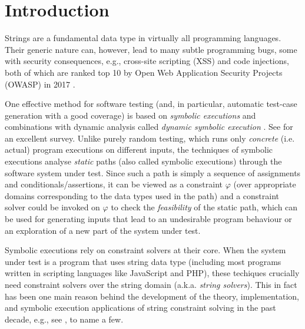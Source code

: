 \section{Introduction}
\label{sec:intro}

Strings are a fundamental data type in virtually all programming languages.
Their generic nature can, however, lead to many subtle programming 
bugs, some with security consequences, e.g., cross-site scripting
(XSS) and code injections, both of which are ranked top 10 by Open Web
Application Security Projects (OWASP) in 2017 \cite{owasp17}. 

One effective
method for software testing (and, in particular, automatic test-case 
generation with a good coverage) is based on \emph{symbolic executions} 
\cite{king76} and combinations with dynamic analysis
called \emph{dynamic symbolic execution} \cite{jalangi,DART,EXE,CUTE,KLEE}.
See \cite{symbex-survey} for an excellent survey. Unlike purely random testing,
which runs only \emph{concrete} (i.e. actual) program executions on different 
inputs, the techniques of symbolic executions analyse \emph{static} paths
(also called symbolic executions) through the software system under test.
Since such a path is simply a sequence of assignments and
conditionals/assertions, it can be viewed as a constraint $\varphi$ (over 
appropriate domains corresponding to the data types used in the path) and a 
constraint solver could be invoked on $\varphi$ to check the \emph{feasibility}
of the static path, which can be used for generating inputs that lead to 
an undesirable program behaviour or an exploration of a new part of the
system under test.

Symbolic executions rely on constraint solvers at their core. When the system
under test is a program that uses string data type (including most programs 
written in scripting languages like JavaScript and PHP), these techiques 
crucially need constraint solvers over the string domain (a.k.a. \emph{string 
solvers}). This in fact has been one main reason behind the development of
the theory, implementation, and symbolic execution applications of string constraint 
solving in the past decade, e.g., see 
\cite{BTV09,Berkeley-JavaScript,HAMPI,Stranger,Vijay-length,YABI14,Abdulla14,LB16,fang-yu-circuits,Abdulla17,CCHLW18,HJLRV18,S3,TCJ16,Z3-str,cvc4,BCFJKKV08,RVG12,jalangi,expose},
to name a few. 






